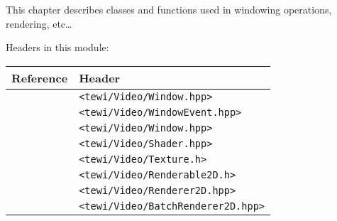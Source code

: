 

This chapter describes classes and functions used in windowing operations, rendering, etc\ldots

Headers in this module: \\

\begin{tabular}{l l}
    Reference & Header \\ \hline
    \nameref{window.syn} & \texttt{<tewi/Video/Window.hpp>} \\
    \nameref{windowevents.syn} & \texttt{<tewi/Video/WindowEvent.hpp>} \\
    \nameref{context.syn} & \texttt{<tewi/Video/Window.hpp>} \\
    \nameref{shader.syn} & \texttt{<tewi/Video/Shader.hpp>} \\
    \nameref{texture.syn} & \texttt{<tewi/Video/Texture.h>} \\
    \nameref{renderable2d.syn} & \texttt{<tewi/Video/Renderable2D.h>} \\
    \nameref{renderer2d.syn} & \texttt{<tewi/Video/Renderer2D.hpp>} \\
    \nameref{batchrenderer2d.syn} & \texttt{<tewi/Video/BatchRenderer2D.hpp>} \\
\end{tabular}








